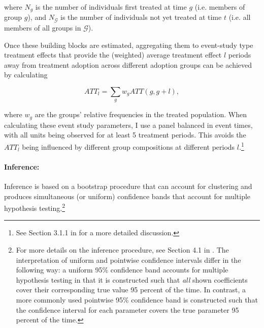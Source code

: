 \noindent where $N_g$ is the number of individuals first treated at time $g$
(i.e. members of group $g$), and $N_\mathcal{G}$ is the number of individuals
not yet treated at time $t$ (i.e. all members of all groups in $\mathcal{G}$).

Once these building blocks are estimated, aggregating them to event-study type treatment effects that provide the (weighted)
average treatment effect $l$ periods away from treatment adoption across
different adoption groups can be achieved by calculating

\begin{equation}
    \label{eq:att_es}
    ATT_l = \sum_g w_gATT(g,g+l),
\end{equation}

\noindent where $w_g$ are the groups' relative frequencies in the treated
population. When calculating these event study parameters, I use a panel
balanced in event times, with all units being observed for at least 5 treatment
periods. This avoids the $ATT_l$ being influenced by different group
compositions at different periods $l$.\footnote{See Section 3.1.1 in
\citet{callaway2021difference} for a more detailed discussion.}


\paragraph{Inference:}%
\label{par:inference_}

Inference is based on a bootstrap procedure that can account for clustering
and produces simultaneous (or uniform) confidence bands that account for
multiple hypothesis testing.\footnote{For more details on the inference
    procedure, see Section 4.1 in \citet{callaway2021difference}. The
    interpretation of uniform and pointwise confidence intervals differ in the
    following way: a uniform 95\% confidence band accounts for multiple
    hypothesis testing in that it is constructed such that \textit{all} shown
    coefficients cover their corresponding true value 95 percent of the time.
    In contrast, a more commonly used pointwise 95\% confidence band is
    constructed such that the confidence interval for each parameter covers the
true parameter 95 percent of the time.} 




